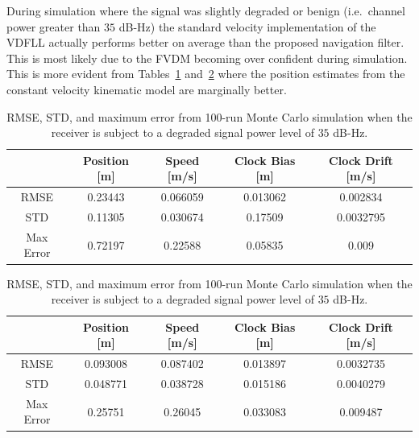 During simulation where the signal was slightly degraded or benign (i.e.\ channel power greater than \(35\) dB-Hz) the standard velocity implementation of the VDFLL actually performs better on average than the proposed navigation filter. This is most likely due to the FVDM becoming over confident during simulation. This is more evident from Tables~\ref{tbl:straight35FVDM} and~\ref{tbl:straight35CV} where the position estimates from the constant velocity kinematic model are marginally better.

\begin{table}[!ht]
    \caption{RMSE, STD, and maximum error from 100-run Monte Carlo simulation when the receiver is subject to a degraded signal power level of \(35\) dB-Hz.}\label{tbl:straight35FVDM}
    \centering
    \begin{tabular}{ccccc}
        \toprule
                  & Position [m] & Speed [m/s] & Clock Bias [m] & Clock Drift [m/s] \\
        \midrule
        RMSE      & 0.23443      & 0.066059    & 0.013062       & 0.002834          \\
        STD       & 0.11305      & 0.030674    & 0.17509        & 0.0032795         \\
        Max Error & 0.72197      & 0.22588     & 0.05835        & 0.009             \\
        \bottomrule
    \end{tabular}
\end{table}

\begin{table}[!ht]
    \caption{RMSE, STD, and maximum error from 100-run Monte Carlo simulation when the receiver is subject to a degraded signal power level of \(35\) dB-Hz.}\label{tbl:straight35CV}
    \centering
    \begin{tabular}{ccccc}
        \toprule
                  & Position [m] & Speed [m/s] & Clock Bias [m] & Clock Drift [m/s] \\
        \midrule
        RMSE      & 0.093008     & 0.087402    & 0.013897       & 0.0032735         \\
        STD       & 0.048771     & 0.038728    & 0.015186       & 0.0040279         \\
        Max Error & 0.25751      & 0.26045     & 0.033083       & 0.009487          \\
        \bottomrule
    \end{tabular}
\end{table}

